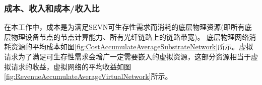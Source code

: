 \subsubsection{成本、收入和成本/收入比}
在本工作中，成本是为满足SEVN可生存性需求而消耗的底层物理资源(即所有底层物理设备节点的节点计算能力、所有光纤链路上的链路带宽)。
底层物理网络消耗资源的平均成本如图\ref{fig:CostAccumulateAverageSubstrateNetwork}所示。虚拟请求为了满足可生存性需求会增广一定需要嵌入的虚拟资源，这部分资源相当于虚拟请求的收益，虚拟网络的平均收益如图\ref{fig:RevenueAccumulateAverageVirtualNetwork}所示。
